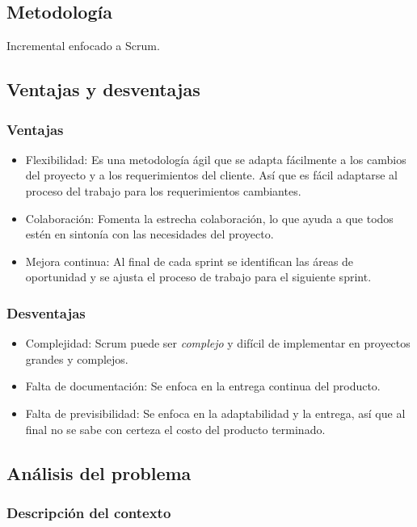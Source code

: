 \documentclass{article}
\begin{document}
\subsection{Metodología}
Incremental enfocado a Scrum.

\subsection{Ventajas y desventajas}

\subsubsection{Ventajas}
\begin{itemize}
	\item Flexibilidad: Es una metodología ágil que se adapta fácilmente a los cambios del proyecto y a los requerimientos del cliente. Así que es fácil adaptarse al proceso del trabajo para los requerimientos cambiantes.
	\item Colaboración: Fomenta la estrecha colaboración, lo que ayuda a que todos estén en sintonía con las necesidades del proyecto.
	\item Mejora continua: Al final de cada sprint se identifican las áreas de oportunidad y se ajusta el proceso de trabajo para el siguiente sprint.
\end{itemize}
\subsubsection{Desventajas}
\begin{itemize}
	\item Complejidad: Scrum puede ser \emph{complejo} y difícil de implementar en proyectos grandes y complejos.
	\item Falta de documentación: Se enfoca en la entrega continua del producto.
	\item Falta de previsibilidad: Se enfoca en la adaptabilidad y la entrega, así que al final no se sabe con certeza el costo del producto terminado.
\end{itemize}

\subsection{Análisis del problema}
\subsubsection{Descripción del contexto}
\end{document}
